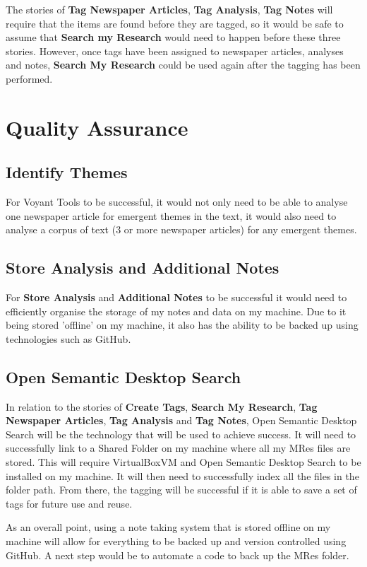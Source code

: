 \documentclass{article}
\begin{document}
The stories of \textbf{Tag Newspaper Articles}, \textbf{Tag Analysis}, \textbf{Tag Notes} will require that the items are found before they are tagged, so it would be safe to assume that \textbf{Search my Research} would need to happen before these three stories. However, once tags have been assigned to newspaper articles, analyses and notes, \textbf{Search My Research} could be used again after the tagging has been performed.

\section*{Quality Assurance}

\subsection*{Identify Themes}

For Voyant Tools to be successful, it would not only need to be able to analyse one newspaper article for emergent themes in the text, it would also need to analyse a corpus of text (3 or more newspaper articles) for any emergent themes.

\subsection*{Store Analysis and Additional Notes}

For \textbf{Store Analysis} and \textbf{Additional Notes} to be successful it would need to efficiently organise the storage of my notes and data on my machine. Due to it being stored 'offline' on my machine, it also has the ability to be backed up using technologies such as GitHub.

\subsection*{Open Semantic Desktop Search}

In relation to the stories of \textbf{Create Tags}, \textbf{Search My Research}, \textbf{Tag Newspaper Articles}, \textbf{Tag Analysis} and \textbf{Tag Notes}, Open Semantic Desktop Search will be the technology that will be used to achieve success. It will need to successfully link to a Shared Folder on my machine where all my MRes files are stored. This will require VirtualBoxVM and Open Semantic Desktop Search to be installed on my machine. It will then need to successfully index all the files in the folder path. From there, the tagging will be successful if it is able to save a set of tags for future use and reuse.

As an overall point, using a note taking system that is stored offline on my machine will allow for everything to be backed up and version controlled using GitHub. A next step would be to automate a code to back up the MRes folder.
\end{document}
